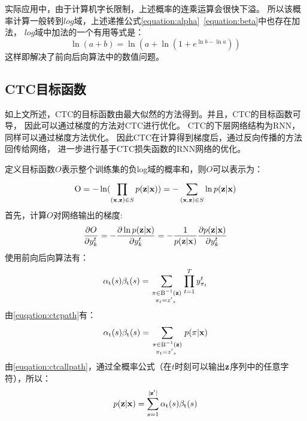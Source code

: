 实际应用中，由于计算机字长限制，上述概率的连乘运算会很快下溢。
所以该概率计算一般转到$log$域，上述递推公式\ref{equation:alpha}~\ref{equation:beta}中也存在加法，
$log$域中加法的一个有用等式是：
\begin{equation}
\ln (a + b) = \ln (a + \ln (1 + {e^{\ln b - \ln a}}))
\end{equation}
这样即解决了前向后向算法中的数值问题。

\subsection{CTC目标函数}

如上文所述，CTC的目标函数由最大似然的方法得到。并且，CTC的目标函数可导，
因此可以通过梯度的方法对CTC进行优化。
CTC的下层网络结构为RNN，同样可以通过梯度方法优化。
因此CTC在计算得到梯度后，通过反向传播的方法回传给网络，
进一步进行基于CTC损失函数的RNN网络的优化。

定义目标函数$O$表示整个训练集的负log域的概率和，则$O$可以表示为：
\begin{equation}
{\rm{O}} =  - \ln (\prod\limits_{({\bf{x}},{\bf{z}}) \in S} {p({\bf{z}}|{\bf{x}})} ) =  - \sum\limits_{({\bf{x}},{\bf{z}}) \in S}^{} {\ln p({\bf{z}}|{\bf{x}})} 
\end{equation}
首先，计算$O$对网络输出的梯度:
\begin{equation}
\label{equation:o}
\frac{{\partial O}}{{\partial y_k^t}} =  - \frac{{\partial \ln p({\bf{z}}|{\bf{x}})}}{{\partial y_k^t}} =  - \frac{1}{{p({\bf{z}}|{\bf{x}})}}\frac{{\partial p({\bf{z}}|{\bf{x}})}}{{\partial y_k^t}}
\end{equation}
使用前向后向算法有：
\begin{equation}
{\alpha _{\rm{t}}}(s){\beta _{\rm{t}}}(s) = \sum\limits_{\scriptstyle\pi  \in {{\rm B}^{ - 1}}({\bf{z}})\hfill\atop
\scriptstyle{\kern 1pt} {\kern 1pt} {\kern 1pt} {\kern 1pt} {\pi _t} = {{z'}_s}\hfill} {\prod\limits_{t = 1}^T {y_{{\pi _t}}^t} } 
\end{equation}
由\ref{euqation:ctcpath}有：
\begin{equation}
{\alpha _{\rm{t}}}(s){\beta _{\rm{t}}}(s) = \sum\limits_{\scriptstyle\pi  \in {{\rm B}^{ - 1}}({\bf{z}})\hfill\atop
\scriptstyle{\kern 1pt} {\kern 1pt} {\kern 1pt} {\kern 1pt} {\pi _t} = {{z'}_s}\hfill} {p(} \pi |{\bf{x}})
\end{equation}
由\ref{euqation:ctcallpath}，通过全概率公式（在$t$时刻可以输出${\bf{z}}$序列中的任意字符），所以：
\begin{equation}
\label{equation:alls}
p({\bf{z}}|{\bf{x}}) = \sum\limits_{s = 1}^{|{\bf{z'}}|} {{\alpha _{\rm{t}}}(s){\beta _{\rm{t}}}(s)}
\end{equation}

